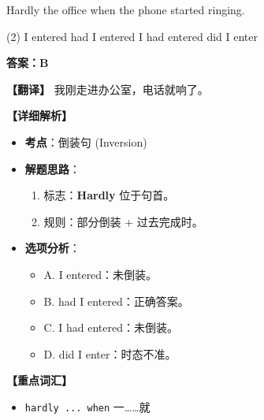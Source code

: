\documentclass[11pt, a4paper]{article}
\newcommand{\analysis}[4]{
    \begin{solutionbox}
        \textbf{答案：#1}
        
        \textbf{【翻译】} #2
        
        \textbf{【详细解析】}
        #3
        
        \textbf{【重点词汇】}
        #4
    \end{solutionbox}
}
\newcommand{\blank}{\underline{\hspace{1.5cm}}}
\begin{document}
\begin{questions}
    \item Hardly \blank the office when the phone started ringing.
    \begin{tasks}(2)
        \task I entered \task had I entered
        \task I had entered \task did I enter
    \end{tasks}
    \analysis{B}{我刚走进办公室，电话就响了。}{
        \begin{itemize}
            \item \textbf{考点}：倒装句 (Inversion)
            \item \textbf{解题思路}：
                \begin{enumerate}
                    \item 标志：\textbf{Hardly} 位于句首。
                    \item 规则：部分倒装 + 过去完成时。
                \end{enumerate}
            \item \textbf{选项分析}：
                \begin{itemize}
                    \item A. I entered：未倒装。
                    \item B. had I entered：正确答案。
                    \item C. I had entered：未倒装。
                    \item D. did I enter：时态不准。
                \end{itemize}
        \end{itemize}
    }{
        \begin{itemize}
            \item \texttt{hardly ... when} 一……就
        \end{itemize}
    }


\end{questions}
\end{document}
